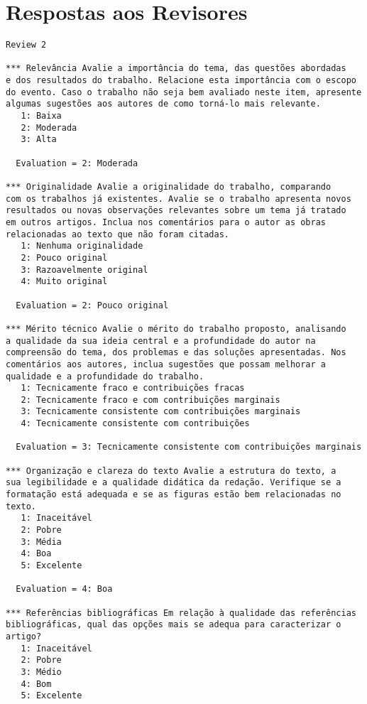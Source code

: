 \section{Respostas aos Revisores}

\begin{verbatim}
Review 2

*** Relevância Avalie a importância do tema, das questões abordadas 
e dos resultados do trabalho. Relacione esta importância com o escopo 
do evento. Caso o trabalho não seja bem avaliado neste item, apresente 
algumas sugestões aos autores de como torná-lo mais relevante.
   1: Baixa
   2: Moderada
   3: Alta

  Evaluation = 2: Moderada

*** Originalidade Avalie a originalidade do trabalho, comparando 
com os trabalhos já existentes. Avalie se o trabalho apresenta novos 
resultados ou novas observações relevantes sobre um tema já tratado 
em outros artigos. Inclua nos comentários para o autor as obras 
relacionadas ao texto que não foram citadas.
   1: Nenhuma originalidade
   2: Pouco original
   3: Razoavelmente original
   4: Muito original

  Evaluation = 2: Pouco original

*** Mérito técnico Avalie o mérito do trabalho proposto, analisando 
a qualidade da sua ideia central e a profundidade do autor na 
compreensão do tema, dos problemas e das soluções apresentadas. Nos 
comentários aos autores, inclua sugestões que possam melhorar a 
qualidade e a profundidade do trabalho.
   1: Tecnicamente fraco e contribuições fracas
   2: Tecnicamente fraco e com contribuições marginais
   3: Tecnicamente consistente com contribuições marginais
   4: Tecnicamente consistente com contribuições

  Evaluation = 3: Tecnicamente consistente com contribuições marginais

*** Organização e clareza do texto Avalie a estrutura do texto, a 
sua legibilidade e a qualidade didática da redação. Verifique se a 
formatação está adequada e se as figuras estão bem relacionadas no 
texto.
   1: Inaceitável
   2: Pobre
   3: Média
   4: Boa
   5: Excelente

  Evaluation = 4: Boa

*** Referências bibliográficas Em relação à qualidade das referências 
bibliográficas, qual das opções mais se adequa para caracterizar o 
artigo?
   1: Inaceitável
   2: Pobre
   3: Médio
   4: Bom
   5: Excelente


\end{verbatim}
